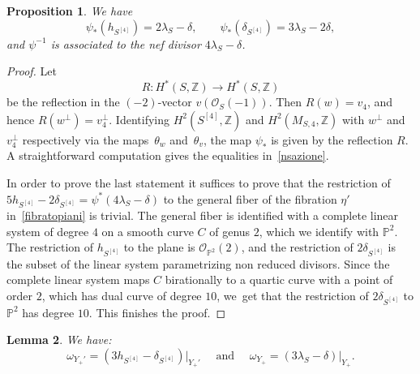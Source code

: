 \documentclass[JEP,XML,SOM,Unicode,published]{cedram}
\let\oldbot\bot
\renewcommand{\bot}{{\scriptscriptstyle\oldbot}}
\newcommand{\PP}{{\mathbb P}}\let\P\PP
\newcommand{\ZZ}{{\mathbb Z}}\let\Z\ZZ
\newcommand\cO{\mathcal{O}}
\newtheorem{lemm}{Lemma}[section]
\newtheorem{prop}[lemm]{Proposition}
\theoremstyle{definition}
\begin{document}
\begin{prop}\label{prop:NefConeHilb4}
We have
\begin{equation}\label{nsazione}
\psi_{*}(h_{S^{[4]}}) = 2 \lambda_S - \delta, \qquad \psi_{*}(\delta_{S^{[4]}}) = 3 \lambda_S - 2\delta,
\end{equation}
and $\psi^{-1}$ is associated to the nef divisor $4 \lambda_S - \delta$.
\end{prop}

\begin{proof}
Let
\[
R\colon H^*(S,\ZZ)\to H^*(S,\ZZ)
\]
be the reflection in the $(-2)$-vector $v(\cO_S(-1))$. Then $R(w)\!=\!v_4$, and hence \hbox{$R(w^{\bot})\!=\!v_4^{\bot}$}. Identifying $H^2(S^{[4]},\ZZ)$ and $H^2(M_{S,4},\ZZ)$ with $w^{\bot}$ and $v_4^{\bot}$ respectively via the maps~$\theta_w$ and~$\theta_v$, the map $\psi_{*}$ is given by the reflection $R$. A straightforward computation gives the equalities in~\eqref{nsazione}.

In order to prove the last statement it suffices to prove that the restriction of $5h_{S^{[4]}}-2\delta_{S^{[4]}}=\psi^{*}(4\lambda_S-\delta)$ to the general fiber of the fibration $\eta'$ in~\eqref{fibratopiani} is trivial. The general fiber is identified with a complete linear system of degree $4$ on a smooth curve $C$ of genus $2$, which we identify with $\PP^2$. The restriction of $h_{S^{[4]}}$ to the plane is $\cO_{\PP^2}(2)$, and the restriction of $2\delta_{S^{[4]}}$ is the subset of the linear system parametrizing non reduced divisors. Since the complete linear system maps $C$ birationally to a quartic curve with a point of order $2$, which has dual curve of degree $10$, we~get that the restriction of $2\delta_{S^{[4]}}$ to $\PP^2$ has degree $10$. This finishes the proof.
\end{proof}

\begin{lemm}\label{lem:CanonicalDivisors}
We have:
\[
\omega_{Y_+'} = (3 h_{S^{[4]}} - \delta_{S^{[4]}})\vert_{Y_+'} \quad
\text{ and }\quad \omega_{Y_+} = (3 \lambda_S - \delta)\vert_{Y_+}.
\]
\end{lemm}
\end{document}
